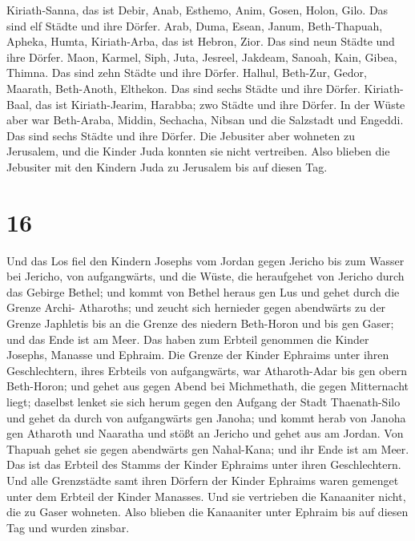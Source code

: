 Kiriath-Sanna, das ist Debir,  Anab, Esthemo, Anim,
 Gosen, Holon, Gilo. Das sind elf Städte und ihre Dörfer.
 Arab, Duma, Esean,  Janum, Beth-Thapuah,
Apheka,  Humta, Kiriath-Arba, das ist Hebron, Zior. Das
sind neun Städte und ihre Dörfer.  Maon, Karmel, Siph,
Juta,  Jesreel, Jakdeam, Sanoah,  Kain, Gibea,
Thimna. Das sind zehn Städte und ihre Dörfer.  Halhul,
Beth-Zur, Gedor,  Maarath, Beth-Anoth, Elthekon. Das sind
sechs Städte und ihre Dörfer.  Kiriath-Baal, das ist
Kiriath-Jearim, Harabba; zwo Städte und ihre Dörfer.  In
der Wüste aber war Beth-Araba, Middin, Sechacha,  Nibsan
und die Salzstadt und Engeddi. Das sind sechs Städte und ihre Dörfer.
 Die Jebusiter aber wohneten zu Jerusalem, und die Kinder
Juda konnten sie nicht vertreiben. Also blieben die Jebusiter mit den
Kindern Juda zu Jerusalem bis auf diesen Tag.

\hypertarget{section-15}{%
\section{16}\label{section-15}}

 Und das Los fiel den Kindern Josephs vom Jordan gegen
Jericho bis zum Wasser bei Jericho, von aufgangwärts, und die Wüste, die
heraufgehet von Jericho durch das Gebirge Bethel;  und kommt
von Bethel heraus gen Lus und gehet durch die Grenze Archi- Atharoths;
 und zeucht sich hernieder gegen abendwärts zu der Grenze
Japhletis bis an die Grenze des niedern Beth-Horon und bis gen Gaser;
und das Ende ist am Meer.  Das haben zum Erbteil genommen
die Kinder Josephs, Manasse und Ephraim.  Die Grenze der
Kinder Ephraims unter ihren Geschlechtern, ihres Erbteils von
aufgangwärts, war Atharoth-Adar bis gen obern Beth-Horon; 
und gehet aus gegen Abend bei Michmethath, die gegen Mitternacht liegt;
daselbst lenket sie sich herum gegen den Aufgang der Stadt Thaenath-Silo
und gehet da durch von aufgangwärts gen Janoha;  und kommt
herab von Janoha gen Atharoth und Naaratha und stößt an Jericho und
gehet aus am Jordan.  Von Thapuah gehet sie gegen abendwärts
gen Nahal-Kana; und ihr Ende ist am Meer. Das ist das Erbteil des Stamms
der Kinder Ephraims unter ihren Geschlechtern.  Und alle
Grenzstädte samt ihren Dörfern der Kinder Ephraims waren gemenget unter
dem Erbteil der Kinder Manasses.  Und sie vertrieben die
Kanaaniter nicht, die zu Gaser wohneten. Also blieben die Kanaaniter
unter Ephraim bis auf diesen Tag und wurden zinsbar.

